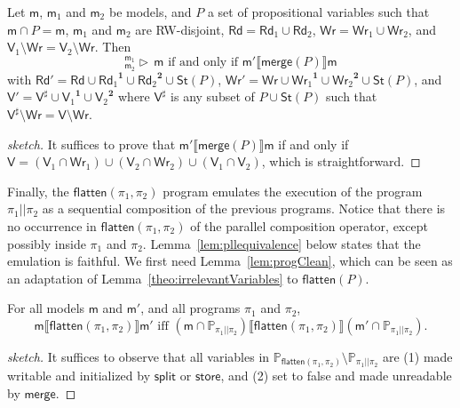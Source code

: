 \documentclass{llncs}
\newcommand{\progStore}{\mathsf{store}}
\newcommand{\progsplit}{\mathsf{split}}
\newcommand{\progmerge}{\mathsf{merge}}
\newcommand{\progFlatten}{\mathsf{flatten}}
\newcommand{\cp}[2]{{#2}^\mathbf{#1}}
\newcommand{\modl}{\mathsf m}
\newcommand{\mrg}[3]{ ^{#2}_{#3} \triangleright \, #1 }
\newcommand{\pll}{ {||} }							%
\newcommand{\readset}{\mathsf{Rd}}
\newcommand{\valuset}{\mathsf{V}}
\newcommand{\writeset}{\mathsf{Wr}}
\newcommand{\storeset}{\mathsf{St}}
\newcommand{\ah}[1]{\**\marginpar{\textbf{AH:} #1}}
\newcommand{\intPgm}[1]{\llbracket #1 \rrbracket}
\newcommand{\propset}{\mathbb P}
\newcommand{\propsetOf}[1]{\propset_{#1}}
\newcommand{\modinter}{\cap}
\begin{document}
\begin{lemma}\label{lem:progmerge}
Let $\modl$, $\modl_1$ and $\modl_2$ be models, and $P$ a set of propositional variables
such that $\modl \modinter P = \modl$,
        $\modl_1$ and $\modl_2$ are RW-disjoint,
        $\readset = \readset_1 \cup \readset_2$,
        $\writeset = \writeset_1 \cup \writeset_2$, and
        $\valuset_1 \setminus \writeset = \valuset_2 \setminus \writeset$.
Then
$$\mrg \modl {\modl_1} {\modl_2} \text{ if and only if }
\modl' \intPgm{\progmerge(P)} \modl$$ with
$\readset' = \readset \cup \cp 1 {\readset_1} \cup \cp 2 {\readset_2} \cup \storeset(P)$,
$\writeset' = \writeset \cup \cp 1 {\writeset_1} \cup \cp 2 {\writeset_2} \cup \storeset(P)$, and
$\valuset' = \valuset^\sharp \cup \cp 1 {\valuset_1} \cup \cp 2 {\valuset_2}$
where $\valuset^\sharp$ is any subset of $P \cup \storeset(P)$ such that
$\valuset^\sharp \setminus \writeset = \valuset \setminus \writeset$.
\end{lemma}
\begin{proof}[sketch]
It suffices to prove that
$\modl' \intPgm{\progmerge(P)} \modl$ if and only if
$\valuset = (\valuset_1 \cap \writeset_1) \cup (\valuset_2 \cap \writeset_2) \cup (\valuset_1 \cap \valuset_2) $,
which is straightforward.
\end{proof}

Finally, the $\progFlatten(\pi_1, \pi_2)$ program emulates the execution of the program $\pi_1 \pll \pi_2$ as
a sequential composition of the previous programs.
Notice that there is no occurrence in $\progFlatten(\pi_1, \pi_2)$ of the parallel composition operator,
except possibly inside $\pi_1$ and $\pi_2$.
Lemma~\ref{lem:pllequivalence} below states that the emulation is faithful.
We first need Lemma~\ref{lem:progClean},
which can be seen as an adaptation of Lemma~\ref{theo:irrelevantVariables} to $\progFlatten(P)$.

\begin{lemma}\label{lem:progClean}
For all models $\modl$ and $\modl'$, and all programs $\pi_1$ and $\pi_2$,
$$
\modl \intPgm{\progFlatten(\pi_1,\pi_2)} \modl' \text{ iff }
(\modl \modinter \propsetOf{\pi_1 \pll \pi_2}) \intPgm{\progFlatten(\pi_1, \pi_2)} (\modl' \modinter \propsetOf{\pi_1 \pll \pi_2}).
$$
\end{lemma}
\begin{proof}[sketch]
It suffices to observe that all variables in $\propsetOf{\progFlatten(\pi_1, \pi_2)} \setminus \propsetOf{\pi_1 \pll \pi_2}$ are 
(1) made writable and initialized by $\progsplit$ or $\progStore$, and 
(2) set to false and made unreadable by $\progmerge$.
\end{proof}
\end{document}
